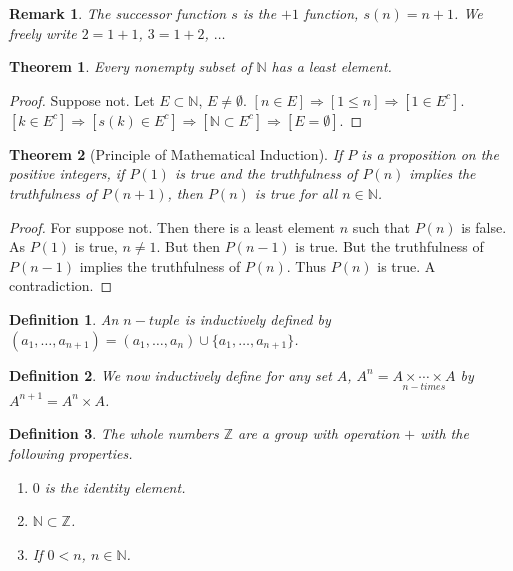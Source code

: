 \documentclass[12pt,oneside]{book}
\theoremstyle{mystyle}
\newtheorem{theorem}{Theorem}[section]
\newtheorem{definition}{Definition}[section]
\newtheorem{remark}{Remark}[section]
\begin{document}
\begin{remark}
The successor function $s$ is the $+1$ function, $s(n)=n+1$. We freely write $2=1+1$, $3=1+2$, $\hdots$
\end{remark}

\begin{theorem}
Every nonempty subset of $\mathbb{N}$ has a least element.
\end{theorem}
\begin{proof}
Suppose not. Let $E\subset \mathbb{N}$, $E\ne\emptyset$. $[n\in E]\Rightarrow [1\leq n]\Rightarrow [1\in E^c]$. $[k\in E^c]\Rightarrow [s(k)\in E^c]\Rightarrow [\mathbb{N} \subset E^c]\Rightarrow [E = \emptyset]$.
\end{proof}

\begin{theorem}[Principle of Mathematical Induction]
If $P$ is a proposition on the positive integers, if $P(1)$ is true and the truthfulness of $P(n)$ implies the truthfulness of $P(n+1)$, then $P(n)$ is true for all $n\in \mathbb{N}$.
\end{theorem}
\begin{proof}
For suppose not. Then there is a least element $n$ such that $P(n)$ is false. As $P(1)$ is true, $n\ne 1$. But then $P(n-1)$ is true. But the truthfulness of $P(n-1)$ implies the truthfulness of $P(n)$. Thus $P(n)$ is true. A contradiction.
\end{proof}

\begin{definition}
An $n-tuple$ is inductively defined by $(a_1,\hdots,a_{n+1}) = (a_1,\hdots, a_n)\cup \{a_1,\hdots,a_{n+1}\}$.
\end{definition}

\begin{definition}
We now inductively define for any set $A$, $A^{n} = \underset{n-times}{A\times \cdots \times A}$ by $A^{n+1} = A^n \times A$.
\end{definition}

\begin{definition}
The whole numbers $\mathbb{Z}$ are a group with operation $+$ with the following properties.
\begin{enumerate}
\item $0$ is the identity element.
\item $\mathbb{N}\subset \mathbb{Z}$.
\item If $0<n$, $n\in \mathbb{N}$.
\end{enumerate}
\end{definition}
\end{document}
